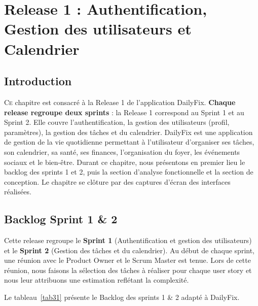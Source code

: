 
\chapter{Release 1 : Authentification, Gestion des utilisateurs et Calendrier}
\minitoc

\renewcommand{\headrulewidth}{1pt}
\fancyhead[C]{} 
\fancyhead[L]{\leftmark}
\fancyhead[R]{}

\renewcommand{\footrulewidth}{1pt}
\fancyfoot[L]{}
\fancyfoot[C]{\thepage}
\fancyfoot[R]{}

\newpage

\section{Introduction}

\lettrine[lines=2]{C}e chapitre est consacré à la Release 1 de l'application DailyFix. \textbf{Chaque release regroupe deux sprints} : la Release 1 correspond au Sprint 1 et au Sprint 2. Elle couvre l'authentification, la gestion des utilisateurs (profil, paramètres), la gestion des tâches et du calendrier. DailyFix est une application de gestion de la vie quotidienne permettant à l'utilisateur d'organiser ses tâches, son calendrier, sa santé, ses finances, l'organisation du foyer, les événements sociaux et le bien-être. Durant ce chapitre, nous présentons en premier lieu le backlog des sprints 1 et 2, puis la section d'analyse fonctionnelle et la section de conception. Le chapitre se clôture par des captures d'écran des interfaces réalisées.

\section{Backlog Sprint 1 \& 2}

Cette release regroupe le \textbf{Sprint 1} (Authentification et gestion des utilisateurs) et le \textbf{Sprint 2} (Gestion des tâches et du calendrier). Au début de chaque sprint, une réunion avec le Product Owner et le Scrum Master est tenue. Lors de cette réunion, nous faisons la sélection des tâches à réaliser pour chaque user story et nous leur attribuons une estimation reflétant la complexité.

Le tableau~\ref{tab31} présente le Backlog des sprints 1 \& 2 adapté à DailyFix.

